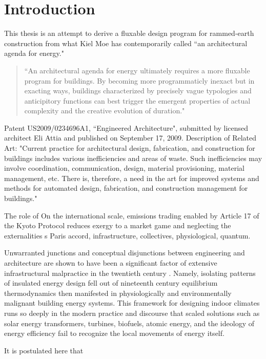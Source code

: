 \section{Introduction}

This thesis is an attempt to derive a fluxable design program for rammed-earth construction from what Kiel Moe has contemporarily called ``an architectural agenda for energy."

\begin{quote}
  ``An architectural agenda for energy ultimately requires a more fluxable program for buildings. By becoming more programmaticly inexact but in exacting ways, buildings characterized by precisely vague typologies and anticipitory functions can best trigger the emergent properties of actual complexity and the creative evolution of duration." \cite[p245]{MOECONVERGENCE}
\end{quote}

Patent US2009/0234696A1, ``Engineered Architecture", submitted by licensed architect Eli Attia and published on September 17, 2009. Description of Related Art: "Current practice for architectural design, fabrication, and construction for buildings includes various inefficiencies and areas of waste. Such inefficiencies may involve coordination, communication, design, material provisioning, material management, etc. There is, therefore, a need in the art for improved systems and methods for automated design, fabrication, and construction management for buildings."


The role of On the international scale, emissions trading enabled by Article 17 of the Kyoto Protocol reduces exergy to a market game and neglecting the externalities s Paris accord, infrastructure, collectives, physiological, quantum.


Unwarranted junctions and conceptual disjunctions between engineering and architecture are shown to have been a significant factor of extensive infrastructural malpractice in the twentieth century \cite{MOEIM}. Namely, isolating patterns of insulated energy design fell out of nineteenth century equilibrium thermodynamics then manifested in physiologically and environmentally malignant building energy systems. This framework for designing indoor climates runs so deeply in the modern practice and discourse that scaled solutions such as solar energy transformers, turbines, biofuels, atomic energy, and the ideology of energy efficiency fail to recognize the local movements of energy itself.

It is postulated here that


